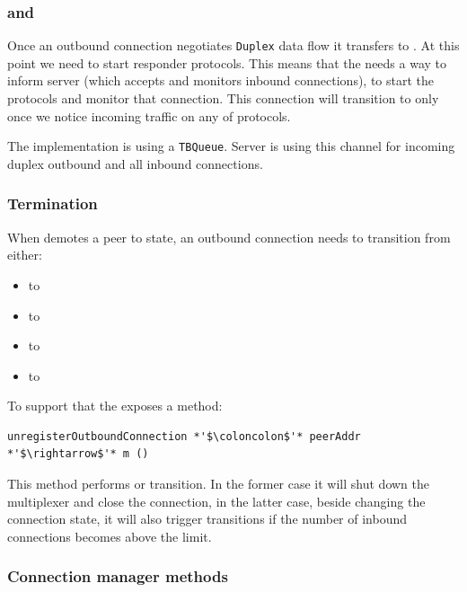 \subsubsection{\OutboundStateDup{} and \DuplexState{}}
Once an outbound connection negotiates \texttt{Duplex} data flow it transfers
to \OutboundStateDup{}.  At this point we need to start responder protocols.
This means that the \connmngr{} needs a way to inform server (which
accepts and monitors inbound connections), to start the protocols and monitor
that connection.  This connection will transition to \DuplexState{} only once
we notice incoming traffic on any of \established{} protocols.

\begin{detail}
  The implementation is using a \texttt{TBQueue}. Server is using this channel
  for incoming duplex outbound and all inbound connections.
\end{detail}

\subsubsection{Termination}\label{sec:outbound_termination}

When \ptopgov{} demotes a peer to \cold{} state, an outbound
connection needs to transition from either:

\begin{itemize}
  \item \OutboundStateUni{} to \TerminatingState{}
  \item \OutboundStateDupTau{} to \InboundIdleStateDup{}
  \item \OutboundStateDup{} to \TerminatingState{}
  \item \DuplexState{} to \InboundStateDup{}
\end{itemize}

To support that the \connmngr{} exposes a method:

\begin{lstlisting}
unregisterOutboundConnection *'$\coloncolon$'* peerAddr *'$\rightarrow$'* m ()
\end{lstlisting}
This method performs \DemotedToColdUniLoc{} or
\DemotedToColdDupLoc{} transition. In the former case it will shut down the
multiplexer and close the \TCP{} connection, in the latter case, beside
changing the connection state, it will also trigger \Prune{} transitions if
the number of inbound connections becomes above the limit.

\subsubsection{Connection manager methods}

